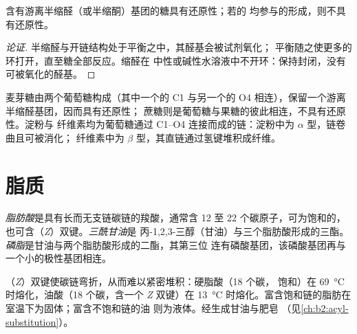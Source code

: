 \begin{proposition}[是否具有还原性]\label{prop:b2:biomolecules:reducing}
含有游离半缩醛（或半缩酮）基团的糖具有还原性；若的
均参与的形成，则不具有还原性。
\end{proposition}

\begin{proof}[论证]
半缩醛与开链结构处于平衡之中，其醛基会被试剂氧化；
平衡随之使更多的环打开，直至糖全部反应。缩醛在
中性或碱性水溶液中不开环：保持封闭，没有可被氧化的醛基。
\end{proof}

麦芽糖由两个葡萄糖构成（其中一个的 C1 与另一个的 O4 相连），保留一个游离半缩醛基团，因而具有还原性；
蔗糖则是葡萄糖与果糖的彼此相连，不具有还原性。淀粉与
纤维素均为葡萄糖通过 C1--O4 连接而成的链：淀粉中为 $\alpha$ 型，链卷曲且可被消化；
纤维素中为 $\beta$ 型，其直链通过氢键堆积成纤维。

\section{脂质}

\begin{definition}[脂质]\label{def:b2:biomolecules:lipid}
\emph{脂肪酸}是具有长而无支链碳链的羧酸，通常含 12 至
22 个碳原子，可为饱和的，也可含（\textit{Z}）双键。\emph{三酰甘油}是
丙-1,2,3-三醇（甘油）与三个脂肪酸形成的三酯。
\emph{磷脂}是甘油与两个脂肪酸形成的二酯，其第三位
连有磷酸基团，该磷酸基团再与一个小的极性基团相连。
\end{definition}

（\textit{Z}）双键使碳链弯折，从而难以紧密堆积：硬脂酸（18 个碳，
饱和）在 \qty{69}{\degreeCelsius} 时熔化，油酸（18 个碳，含一个 \textit{Z} 双键）在
\qty{13}{\degreeCelsius} 时熔化。富含饱和链的脂肪在室温下为固体；富含不饱和链的油
则为液体。经生成甘油与肥皂
（见\cref{ch:b2:acyl-substitution}）。

